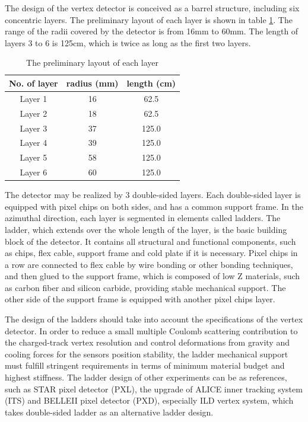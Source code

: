 The design of the vertex detector is conceived as a barrel structure, including six concentric layers. The preliminary layout of each layer is shown in table \ref{tab:layout}. The range of the radii covered by the detector is from 16mm to 60mm. The length of layers 3 to 6 is 125cm, which is twice as long as the first two layers.
\begin{table}[!h]
	\centering
	\begin{tabular}{c c c}
		\hline
		No. of layer & radius (mm) & length (cm) \\
		\hline
		Layer 1 & 16 & 62.5 \\
		\hline
		Layer 2 & 18 & 62.5 \\
		\hline
		Layer 3 & 37 & 125.0 \\
		\hline
		Layer 4 & 39 & 125.0 \\
		\hline
		Layer 5 & 58 & 125.0 \\
		\hline
		Layer 6 & 60 & 125.0 \\
		\hline
	\end{tabular}
	\caption{The preliminary layout of each layer}
	\label{tab:layout}
\end{table}


The detector may be realized by 3 double-sided layers. Each double-sided layer is equipped with pixel chips on both sides, and has a common support frame. In the azimuthal direction, each layer is segmented in elements called ladders. The ladder, which extends over the whole length of the layer, is the basic building block of the detector. It contains all structural and functional components, such as chips, flex cable, support frame and cold plate if it is necessary. Pixel chips in a row are connected to flex cable by wire bonding or other bonding techniques, and then glued to the support frame, which is composed of low Z materials, such as carbon fiber and silicon carbide, providing stable mechanical support. The other side of the support frame is equipped with another pixel chips layer. 


The design of the ladders should take into account the specifications of the vertex detector. In order to reduce a small multiple Coulomb scattering contribution to the charged-track vertex resolution and control deformations from gravity and cooling forces for the sensors position stability, the ladder mechanical support must fulfill stringent requirements in terms of minimum material budget and highest stiffness. The ladder design of other experiments can be as references, such as STAR pixel detector (PXL), the upgrade of ALICE inner tracking system (ITS) and BELLEII pixel detector (PXD), especially ILD vertex system, which takes double-sided ladder as an alternative ladder design. 


